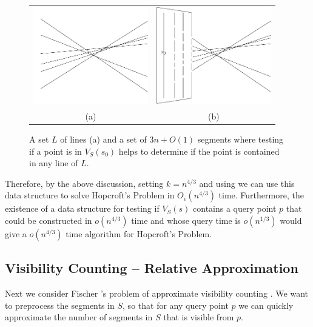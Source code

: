 \documentclass{patmorin}
\newcommand{\Oe}{O_\epsilon}
\begin{document}
\begin{figure}
  \begin{center}
    \begin{tabular}{cc}
      \includegraphics[width=5cm]{hopcroft-a} &
      \includegraphics[width=5cm]{hopcroft-b} \\
      (a) & (b)
    \end{tabular}
  \end{center}
  \caption{A set $L$ of lines (a) and a set of $3n+O(1)$ segments where
           testing if a point is in $V_S(s_0)$ helps to determine if
           the point is contained in any line of $L$.}
\end{figure}

Therefore, by the above discussion, setting $k=n^{4/3}$ and using
 we can use this data structure to solve Hopcroft's
Problem in $\Oe(n^{4/3})$ time.  Furthermore, the existence of a data
structure for testing if $V_S(s)$ contains a query point $p$ that could be
constructed in $o(n^{4/3})$ time and whose query time is $o(n^{1/3})$ would
give a $o(n^{4/3})$ time algorithm for Hopcroft's Problem.

\subsection{Visibility Counting -- Relative Approximation} \label{sec:VizCountingRel}

Next we consider Fischer \etal's problem of approximate visibility
counting \cite{fhjmz08,fhjmz09}.  We want to preprocess the segments
in $S$, so that for any query point $p$ we can quickly approximate the
number of segments in $S$ that is visible from $p$.
\end{document}
